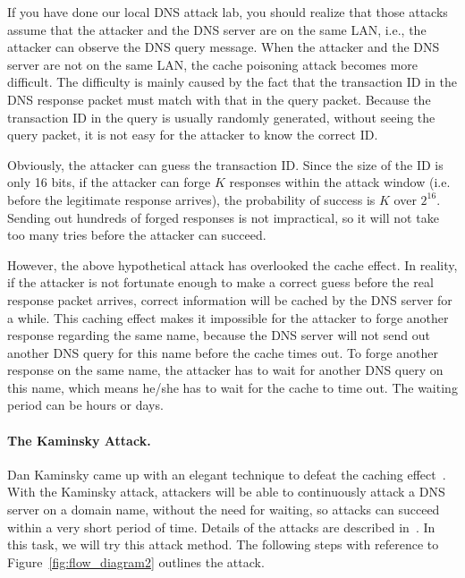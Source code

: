 If you have done our local DNS attack lab, you should realize that 
those attacks assume that the attacker and the DNS server are on
the same LAN, i.e., the attacker can observe the DNS query message. 
When the attacker and the DNS server are not on the same LAN,
the cache poisoning attack becomes more difficult.
The difficulty is mainly caused by the fact that the transaction ID
in the DNS response packet must match with that 
in the query packet. Because the transaction ID in the query is 
usually randomly generated, without seeing the query packet,
it is not easy for the attacker to know the correct ID.


Obviously, the attacker can guess the transaction ID. Since the
size of the ID is only 16 bits, if the attacker can forge $K$ 
responses within the attack window (i.e. before the legitimate
response arrives), the probability of success is $K$ over $2^{16}$.
Sending out hundreds of forged responses is not impractical, so
it will not take too many tries before the attacker can succeed. 


However, the above hypothetical attack has overlooked the cache effect.
In reality, if the attacker is not fortunate enough to make a correct guess before
the real response packet arrives, correct information will be cached 
by the DNS server for a while. This caching effect makes it impossible
for the attacker to forge another response regarding the same 
name, because the DNS server will not send out another DNS query for 
this name before the cache times out.
To forge another response on the same name, the attacker has to 
wait for another DNS query on this name, which means he/she has to
wait for the cache to time out. The waiting period can be hours or days.


\paragraph{The Kaminsky Attack.} 
Dan Kaminsky came up with an elegant technique to defeat the caching
effect~\cite{dns:Kaminsky}.
With the Kaminsky attack, attackers will be able to continuously attack
a DNS server on a domain name, without the need for waiting, so
attacks can succeed within a very short period of time.
Details of the attacks are described in~\cite{dns:Kaminsky,seedbook}. 
In this task, we will try this attack method. The following steps with reference to 
Figure~\ref{fig:flow_diagram2} outlines the attack. 

